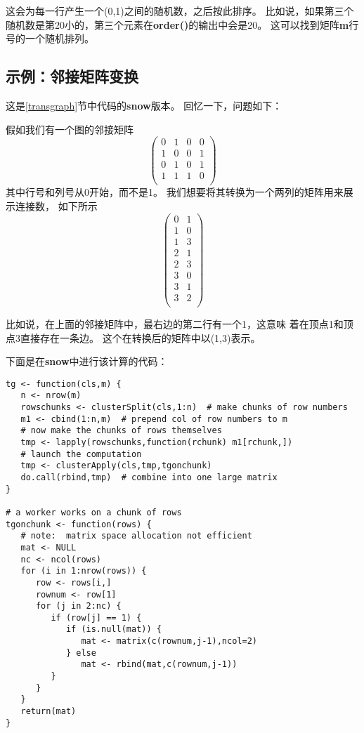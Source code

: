 这会为每一行产生一个(0,1)之间的随机数，之后按此排序。
比如说，如果第三个随机数是第20小的，第三个元素在{\bf order()}的输出中会是20。
这可以找到矩阵{\bf m}行号的一个随机排列。

\subsection{示例：邻接矩阵变换}
\label{snowadj}

这是\ref{transgraph}节中代码的{\bf snow}版本。
回忆一下，问题如下：

假如我们有一个图的邻接矩阵
\begin{equation}
\left (
\begin{array}{rrrr}
0 & 1 & 0 & 0 \\
1 & 0 & 0 & 1 \\
0 & 1 & 0 & 1 \\
1 & 1 & 1 & 0 \\
\end{array}
\right )
\end{equation}
其中行号和列号从0开始，而不是1。
我们想要将其转换为一个两列的矩阵用来展示连接数，
如下所示
\begin{equation}
\left (
\begin{array}{rr}
0 & 1 \\
1 & 0 \\
1 & 3 \\
2 & 1 \\
2 & 3 \\
3 & 0 \\
3 & 1 \\
3 & 2 \\
\end{array}
\right )
\end{equation}

比如说，在上面的邻接矩阵中，最右边的第二行有一个1，这意味
着在顶点1和顶点3直接存在一条边。
这个在转换后的矩阵中以(1,3)表示。

下面是在{\bf snow}中进行该计算的代码：

\begin{lstlisting}
tg <- function(cls,m) {
   n <- nrow(m)
   rowschunks <- clusterSplit(cls,1:n)  # make chunks of row numbers
   m1 <- cbind(1:n,m)  # prepend col of row numbers to m
   # now make the chunks of rows themselves
   tmp <- lapply(rowschunks,function(rchunk) m1[rchunk,])
   # launch the computation
   tmp <- clusterApply(cls,tmp,tgonchunk)
   do.call(rbind,tmp)  # combine into one large matrix
}

# a worker works on a chunk of rows
tgonchunk <- function(rows) {
   # note:  matrix space allocation not efficient
   mat <- NULL
   nc <- ncol(rows)
   for (i in 1:nrow(rows)) {
      row <- rows[i,]
      rownum <- row[1]
      for (j in 2:nc) {
         if (row[j] == 1) {
            if (is.null(mat)) {
               mat <- matrix(c(rownum,j-1),ncol=2)
            } else
               mat <- rbind(mat,c(rownum,j-1))
         }
      }
   }
   return(mat)
}
\end{lstlisting}

